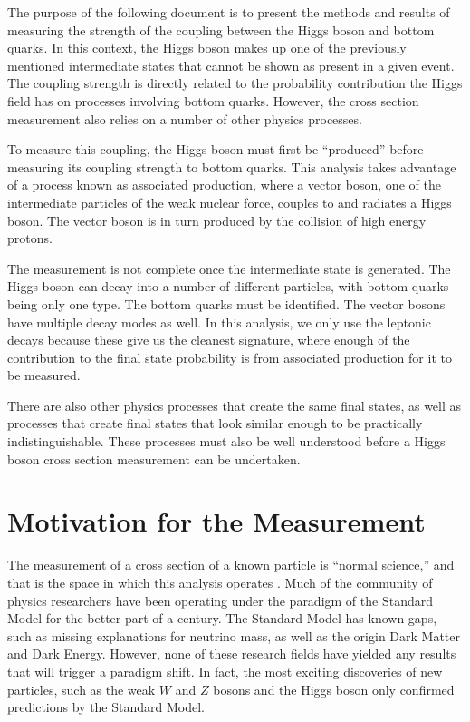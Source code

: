 The purpose of the following document is to present the methods and results
of measuring the strength of the coupling between the Higgs boson and bottom quarks.
In this context, the Higgs boson makes up one of the previously mentioned
intermediate states that cannot be shown as present in a given event.
The coupling strength is directly related to the probability contribution
the Higgs field has on processes involving bottom quarks.
However, the cross section measurement also relies on a number of other physics processes.

To measure this coupling, the Higgs boson must first be ``produced''
before measuring its coupling strength to bottom quarks.
This analysis takes advantage of a process known as associated production,
where a vector boson, one of the intermediate particles of the weak nuclear force,
couples to and radiates a Higgs boson.
The vector boson is in turn produced by the collision of high energy protons.

The measurement is not complete once the intermediate state is generated.
The Higgs boson can decay into a number of different particles,
with bottom quarks being only one type.
The bottom quarks must be identified.
The vector bosons have multiple decay modes as well.
In this analysis, we only use the leptonic decays because
these give us the cleanest signature,
where enough of the contribution to the final state probability
is from associated production for it to be measured.

There are also other physics processes that create the same final states,
as well as processes that create final states that look similar enough
to be practically indistinguishable.
These processes must also be well understood before a Higgs boson cross section measurement
can be undertaken.

\section{Motivation for the Measurement}

The measurement of a cross section of a known particle is ``normal science,''
and that is the space in which this analysis operates \cite{Kuhn:1970}.
Much of the community of physics researchers have been operating under the paradigm
of the Standard Model for the better part of a century.
The Standard Model has known gaps,
such as missing explanations for neutrino mass,
as well as the origin Dark Matter and Dark Energy.
However, none of these research fields have yielded any results
that will trigger a paradigm shift.
In fact, the most exciting discoveries of new particles,
such as the weak $W$ \cite{PhysRevLett.50.1738} and $Z$ \cite{dau1983ua1}
bosons and the Higgs boson \cite{Chatrchyan_2012,PhysRevD.86.032003} only confirmed
predictions by the Standard Model.

